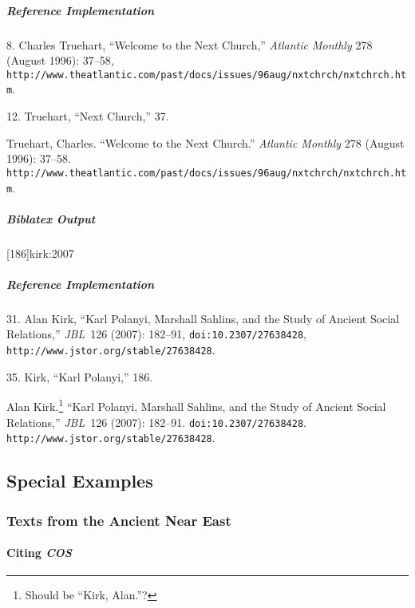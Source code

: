 \documentclass[a4paper]{article}
\newenvironment{biboutput}{%
  \subparagraph{Biblatex Output}
}{\color{black}}
\newenvironment{refimp}{%
  \subparagraph{Reference Implementation}
  \color{reference-colour}
  \rm
}{\par\color{black}}
\begin{document}
\begin{refimp}
  \hspace*{\bibindent}8. Charles Truehart, “Welcome to the Next Church,”
  \emph{Atlantic Monthly} 278 (August 1996): 37–58,
  \nolinkurl{http://www.theatlantic.com/past/docs/issues/96aug/nxtchrch/nxtchrch.htm}.

  \hspace*{\bibindent}12. Truehart, “Next Church,” 37.
 
  \sloppy\hangindent\bibindent Truehart, Charles. “Welcome to the Next Church.”
  \emph{Atlantic Monthly} 278 (August 1996): 37–58.
  \nolinkurl{http://www.theatlantic.com/past/docs/issues/96aug/nxtchrch/nxtchrch.htm}.
\end{refimp}

\begin{biboutput}
  [186]{kirk:2007}
\end{biboutput}

\begin{refimp}
  \hspace*{\bibindent}31. Alan Kirk, “Karl Polanyi, Marshall Sahlins, and the
  Study of Ancient Social Relations,” \emph{JBL}~126 (2007): 182–91,
  \nolinkurl{doi:10.2307/27638428},
  \nolinkurl{http://www.jstor.org/stable/27638428}.

  \hspace*{\bibindent}35. Kirk, “Karl Polanyi,” 186.

  \hangindent\bibindent Alan Kirk.\footnote{Should be “Kirk, Alan.”?} “Karl
  Polanyi, Marshall Sahlins, and the Study of Ancient Social Relations,”
  \emph{JBL}~126 (2007): 182–91. \nolinkurl{doi:10.2307/27638428}.
  \nolinkurl{http://www.jstor.org/stable/27638428}.

\end{refimp}

\subsection{Special Examples}

\subsubsection{Texts from the Ancient Near East}

\paragraph{Citing \textsl{COS}}
\end{document}
